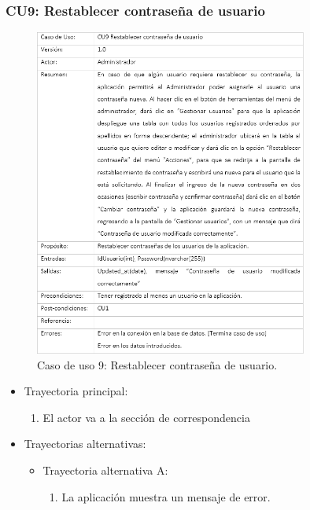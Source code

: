 		\subsubsection{CU9: Restablecer contraseña de usuario}
			\begin{figure}[htbp!]
				\centering
					\includegraphics[width=0.8\textwidth]{images/CU/CU9}
					\caption{Caso de uso 9: Restablecer contraseña de usuario.}
				\label{Tabla}
			\end{figure}
			
			\begin{itemize}
				\item Trayectoria principal:
					\begin{enumerate}
						\item El actor va a la sección de correspondencia 
					\end{enumerate}
				\item Trayectorias alternativas:
					\begin{itemize}
						\item Trayectoria alternativa A:
							\begin{enumerate}
								\item La aplicación muestra un mensaje de error.
							\end{enumerate}
					\end{itemize}
			\end{itemize}
			
